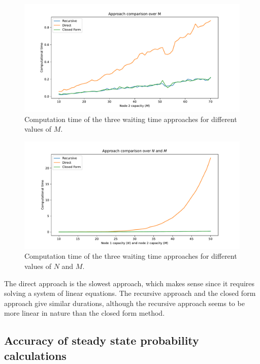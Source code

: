 \begin{figure}[H]
    \includegraphics[width=\textwidth]{chapters/03_queueing_model/img/numeric_results_and_timings/waiting_time_formulas_comparison/algorithm_duration_over_M.pdf}
    \caption{Computation time of the three waiting time approaches for different values
    of \(M\).}
    \label{fig:waiting_time_algorithm_duration_over_M}
\end{figure}


\begin{figure}[H]
    \includegraphics[width=\textwidth]{chapters/03_queueing_model/img/numeric_results_and_timings/waiting_time_formulas_comparison/algorithm_duration_over_N_and_M.pdf}
    \caption{Computation time of the three waiting time approaches for different values
    of \(N\) and \(M\).}
    \label{fig:waiting_time_algorithm_duration_over_N_and_M}
\end{figure}

The direct approach is the slowest approach, which makes sense since it requires
solving a system of linear equations.
The recursive approach and the closed form approach give similar durations,
although the recursive approach seems to be more linear in nature than the
closed form method.


\subsection{Accuracy of steady state probability calculations}

